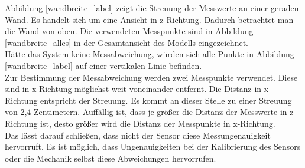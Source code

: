 Abbildung \ref{wandbreite_label} zeigt die Streuung der Messwerte an einer geraden Wand. Es handelt sich um eine Ansicht in z-Richtung. Dadurch betrachtet man die Wand von oben. Die verwendeten Messpunkte sind in Abbildung \ref{wandbreite_alles} in der Gesamtansicht des Modells eingezeichnet.  \\
Hätte das System keine Messabweichung, würden sich alle Punkte in Abbildung \ref{wandbreite_label} auf einer vertikalen Linie befinden. \\
Zur Bestimmung der Messabweichung werden zwei Messpunkte verwendet. Diese sind in x-Richtung möglichst weit voneinander entfernt. Die Distanz in x-Richtung entspricht der Streuung. Es kommt an dieser Stelle zu einer Streuung von 2,4 Zentimetern. Auffällig ist, dass je größer die Distanz der Messwerte in z-Richtung ist, desto größer wird die Distanz der Messpunkte in x-Richtung.\\
Das lässt darauf schließen, dass nicht der Sensor diese Messungenauigkeit hervorruft. Es ist möglich, dass Ungenauigkeiten bei der Kalibrierung des Sensors oder die Mechanik selbst diese Abweichungen hervorrufen. 


